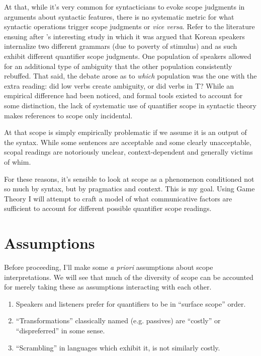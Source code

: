 \documentclass{article}
\begin{document}
At that, while it's very common for syntacticians to evoke scope judgments in arguments about syntactic features, there is no systematic metric for what syntactic operations trigger scope judgments or \textit{vice versa}.
Refer to the literature ensuing after \textcite{han07}'s interesting study in which it was argued that Korean speakers internalize two different grammars (due to poverty of stimulus) and as such exhibit different quantifier scope judgments.
One population of speakers allowed for an additional type of ambiguity that the other population consistently rebuffed.
That said, the debate arose as to \emph{which} population was the one with the extra reading: did low verbs create ambiguity, or did verbs in T?
While an empirical difference had been noticed, and formal tools existed to account for some distinction, the lack of systematic use of quantifier scope in syntactic theory makes references to scope only incidental.

At that scope is simply empirically problematic if we assume it is an output of the syntax.
While some sentences are acceptable and some clearly unacceptable, scopal readings are notoriously unclear, context-dependent and generally victims of whim.

For these reasons, it's sensible to look at scope as a phenomenon conditioned not so much by syntax, but by pragmatics and context.
This is my goal.
Using Game Theory \parencite{neumann44,hart92} I will attempt to craft a model of what communicative factors are sufficient to account for different possible quantifier scope readings.

\section{Assumptions\label{assump}}


Before proceeding, I'll make some \emph{a priori} assumptions about scope interpretations.
We will see that much of the diversity of scope can be accounted for merely taking these as assumptions interacting with each other.

\begin{enumerate}
\item Speakers and listeners prefer for quantifiers to be in ``surface scope'' order.
\item ``Transformations'' classically named (e.g. passives) are ``costly'' or ``dispreferred'' in some sense.
\item ``Scrambling'' in languages which exhibit it, is not similarly costly.
\end{enumerate}
\end{document}
